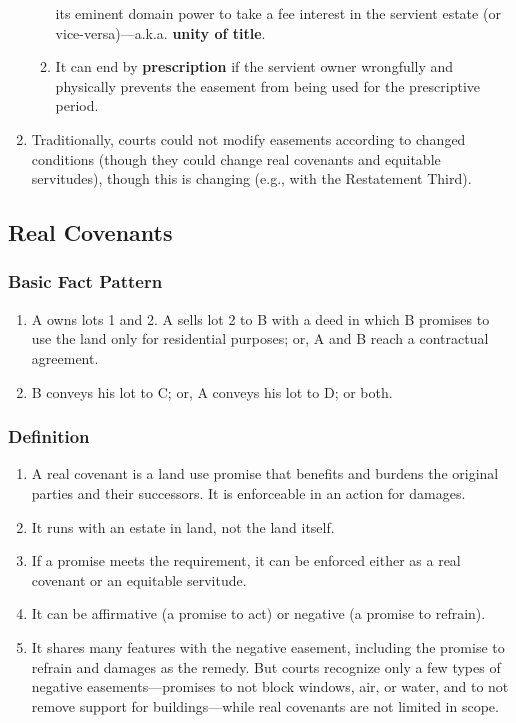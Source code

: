 \begin{enumerate}
\begin{enumerate}
        its eminent domain power to take a fee interest in the servient 
        estate (or vice-versa)---a.k.a. \textbf{unity of title}.
        \item It can end by \textbf{prescription} if the servient owner 
        wrongfully and physically prevents the easement from being used for 
        the prescriptive period.
    \end{enumerate}
    \item Traditionally, courts could not modify easements according to 
    changed conditions (though they could change real covenants and equitable 
    servitudes), though this is changing (e.g., with the Restatement Third).
\end{enumerate}

\subsection{Real Covenants}

\subsubsection{Basic Fact Pattern}

\begin{enumerate}
    \item A owns lots 1 and 2. A sells lot 2 to B with a deed in which B 
    promises to use the land only for residential purposes; or, A and B reach 
    a contractual agreement.
    \item B conveys his lot to C; or, A conveys his lot to D; or both.
\end{enumerate}

\subsubsection{Definition}

\begin{enumerate}
    \item A real covenant is a land use promise that benefits and burdens the 
    original parties and their successors. It is enforceable in an action for 
    damages.
    \item It runs with an estate in land, not the land itself.
    \item If a promise meets the requirement, it can be enforced either as a 
    real covenant or an equitable servitude.
    \item It can be affirmative (a promise to act) or negative (a promise to 
    refrain).
    \item It shares many features with the negative easement, including the 
    promise to refrain and damages as the remedy. But courts recognize only a 
    few types of negative easements---promises to not block windows, air, or 
    water, and to not remove support for buildings---while real covenants are 
    not limited in scope.
\end{enumerate}

